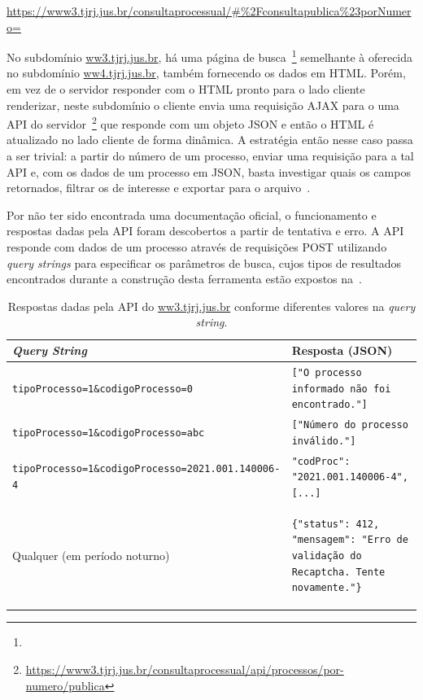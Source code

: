 \urldef\urlConsultaJson\url{https://www3.tjrj.jus.br/consultaprocessual/#%2Fconsultapublica%23porNumero=}

No subdomínio \url{ww3.tjrj.jus.br}, há uma página de
busca~\footnote{\urlConsultaJson} semelhante à oferecida no subdomínio
\url{ww4.tjrj.jus.br}, também fornecendo os dados em HTML. Porém, em vez de o
servidor responder com o HTML pronto para o lado cliente renderizar, neste
subdomínio o cliente envia uma requisição AJAX para o uma API do
servidor~\footnote{\url{https://www3.tjrj.jus.br/consultaprocessual/api/processos/por-numero/publica}}
que responde com um objeto JSON e então o HTML é atualizado no lado cliente de
forma dinâmica. A estratégia então nesse caso passa a ser trivial: a partir do
número de um processo, enviar uma requisição para a tal API e, com os dados de
um processo em JSON, basta investigar quais os campos retornados, filtrar os de
interesse e exportar para o arquivo~\cite{spec:jsonlines}.

Por não ter sido encontrada uma documentação oficial, o funcionamento e
respostas dadas pela API foram descobertos a partir de tentativa e erro. A API
responde com dados de um processo através de requisições POST utilizando
\textit{query strings} para especificar os parâmetros de busca, cujos tipos de
resultados encontrados durante a construção desta ferramenta estão expostos
na~.

\begin{table}[htb]
    \tiny
    \centering
    \begin{tabular}{lp{}}
        \toprule
        \textit{Query String} & Resposta (JSON) \\
        \midrule
        \texttt{tipoProcesso=1\&codigoProcesso=0} & \texttt{["O processo informado não foi encontrado."]} \\
        \texttt{tipoProcesso=1\&codigoProcesso=abc} & \texttt{["Número do processo inválido."]} \\
        \texttt{tipoProcesso=1\&codigoProcesso=2021.001.140006-4} & \texttt{{"codProc": "2021.001.140006-4", [...]}} \\
        Qualquer (em período noturno) & \begin{minipage}{0.6\textwidth}
            \begin{verbatim}
{"status": 412, "mensagem": "Erro de validação do Recaptcha. Tente novamente."}
            \end{verbatim}
        \end{minipage}
        \\
        \bottomrule
    \end{tabular}
    \caption{%
        Respostas dadas pela API do \url{ww3.tjrj.jus.br} conforme diferentes valores na \textit{query string}.
    }
    \label{tbl:respostas-ww3}
\end{table}

